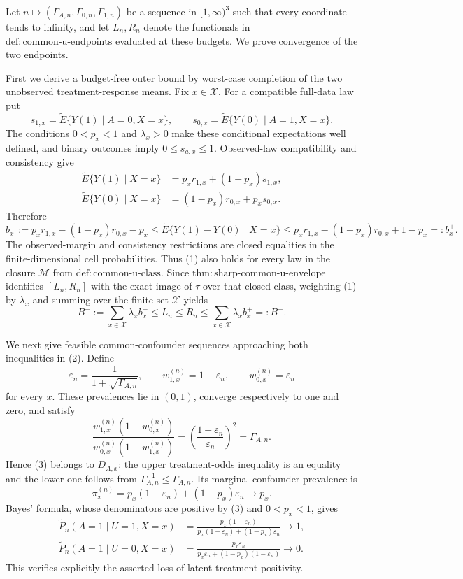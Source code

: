 Let \(n\mapsto(\Gamma_{A,n},\Gamma_{0,n},\Gamma_{1,n})\) be a sequence in \([1,\infty)^3\) such that every coordinate tends to infinity, and let \(L_n,R_n\) denote the functionals in \(\mathrm{def{:}common\text{-}u\text{-}endpoints}\) evaluated at these budgets.  We prove convergence of the two endpoints.

First we derive a budget-free outer bound by worst-case completion of the two unobserved treatment-response means.  Fix \(x\in\mathcal X\).  For a compatible full-data law put
\[
 s_{1,x}=\widetilde E\{Y(1)\mid A=0,X=x\},
 \qquad
 s_{0,x}=\widetilde E\{Y(0)\mid A=1,X=x\}.
\]
The conditions \(0<p_x<1\) and \(\lambda_x>0\) make these conditional expectations well defined, and binary outcomes imply \(0\leq s_{a,x}\leq1\).  Observed-law compatibility and consistency give
\[
\begin{aligned}
 \widetilde E\{Y(1)\mid X=x\}
   &=p_xr_{1,x}+(1-p_x)s_{1,x},\\
 \widetilde E\{Y(0)\mid X=x\}
   &=(1-p_x)r_{0,x}+p_xs_{0,x}.
\end{aligned}
\]
Therefore
\[
 b_x^-:=p_xr_{1,x}-(1-p_x)r_{0,x}-p_x
 \leq \widetilde E\{Y(1)-Y(0)\mid X=x\}
 \leq p_xr_{1,x}-(1-p_x)r_{0,x}+1-p_x=:b_x^+.
 \tag{1}
\]
The observed-margin and consistency restrictions are closed equalities in the finite-dimensional cell probabilities.  Thus (1) also holds for every law in the closure \(\mathcal M\) from \(\mathrm{def{:}common\text{-}u\text{-}class}\).  Since \(\mathrm{thm{:}sharp\text{-}common\text{-}u\text{-}envelope}\) identifies \([L_n,R_n]\) with the exact image of \(\tau\) over that closed class, weighting (1) by \(\lambda_x\) and summing over the finite set \(\mathcal X\) yields
\[
 B^-:=\sum_{x\in\mathcal X}\lambda_xb_x^-
 \leq L_n\leq R_n\leq
 \sum_{x\in\mathcal X}\lambda_xb_x^+=:B^+.
 \tag{2}
\]

We next give feasible common-confounder sequences approaching both inequalities in (2).  Define
\[
 \varepsilon_n=\frac{1}{1+\sqrt{\Gamma_{A,n}}},
 \qquad
 w_{1,x}^{(n)}=1-\varepsilon_n,
 \qquad
 w_{0,x}^{(n)}=\varepsilon_n
 \tag{3}
\]
for every \(x\).  These prevalences lie in \((0,1)\), converge respectively to one and zero, and satisfy
\[
 \frac{w_{1,x}^{(n)}(1-w_{0,x}^{(n)})}
      {w_{0,x}^{(n)}(1-w_{1,x}^{(n)})}
 =\left(\frac{1-\varepsilon_n}{\varepsilon_n}\right)^2
 =\Gamma_{A,n}.
 \tag{4}
\]
Hence (3) belongs to \(D_{A,x}\): the upper treatment-odds inequality is an equality and the lower one follows from \(\Gamma_{A,n}^{-1}\leq\Gamma_{A,n}\).  Its marginal confounder prevalence is
\[
 \pi_x^{(n)}=p_x(1-\varepsilon_n)+(1-p_x)\varepsilon_n\longrightarrow p_x.
 \tag{5}
\]
Bayes' formula, whose denominators are positive by (3) and \(0<p_x<1\), gives
\[
\begin{aligned}
 \widetilde P_n(A=1\mid U=1,X=x)
 &=\frac{p_x(1-\varepsilon_n)}
         {p_x(1-\varepsilon_n)+(1-p_x)\varepsilon_n}
 \longrightarrow1,\\
 \widetilde P_n(A=1\mid U=0,X=x)
 &=\frac{p_x\varepsilon_n}
         {p_x\varepsilon_n+(1-p_x)(1-\varepsilon_n)}
 \longrightarrow0.
\end{aligned}
\tag{6}
\]
This verifies explicitly the asserted loss of latent treatment positivity.

